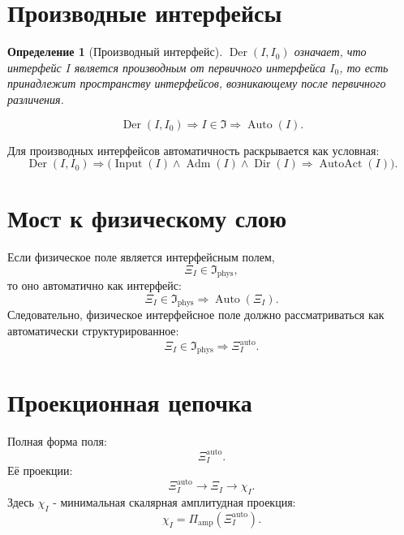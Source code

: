 \documentclass[12pt,a4paper]{article}
\newtheorem{definition}{Определение}
\DeclareMathOperator{\Auto}{Auto}
\DeclareMathOperator{\Input}{Input}
\DeclareMathOperator{\Adm}{Adm}
\DeclareMathOperator{\Dir}{Dir}
\DeclareMathOperator{\AutoAct}{AutoAct}
\DeclareMathOperator{\Der}{Der}
\newcommand{\Ispace}{\mathfrak I}
\newcommand{\XiAuto}{\Xi_I^{\mathrm{auto}}}
\newcommand{\PiAmp}{\Pi_{\mathrm{amp}}}
\begin{document}
\section{Производные интерфейсы}
\begin{definition}[Производный интерфейс]
\(\Der(I,I_0)\) означает, что интерфейс \(I\) является производным от первичного интерфейса \(I_0\), то есть принадлежит пространству интерфейсов, возникающему после первичного различения.
\end{definition}

\begin{equation}
\boxed{\Der(I,I_0)\Rightarrow I\in\Ispace\Rightarrow\Auto(I).}
\end{equation}

Для производных интерфейсов автоматичность раскрывается как условная:
\begin{equation}
\boxed{\Der(I,I_0)\Rightarrow\bigl(\Input(I)\land\Adm(I)\land\Dir(I)\Rightarrow\AutoAct(I)\bigr).}
\end{equation}

\section{Мост к физическому слою}
Если физическое поле является интерфейсным полем,
\begin{equation}
\Xi_I\in\Ispace_{\mathrm{phys}},
\end{equation}
то оно автоматично как интерфейс:
\begin{equation}
\boxed{\Xi_I\in\Ispace_{\mathrm{phys}}\Rightarrow\Auto(\Xi_I).}
\end{equation}
Следовательно, физическое интерфейсное поле должно рассматриваться как автоматически структурированное:
\begin{equation}
\boxed{\Xi_I\in\Ispace_{\mathrm{phys}}\Rightarrow\XiAuto.}
\end{equation}

\section{Проекционная цепочка}
Полная форма поля:
\begin{equation}
\boxed{\XiAuto.}
\end{equation}
Её проекции:
\begin{equation}
\boxed{\XiAuto\to\Xi_I\to\chi_I.}
\end{equation}
Здесь \(\chi_I\) - минимальная скалярная амплитудная проекция:
\begin{equation}
\boxed{\chi_I=\PiAmp(\XiAuto).}
\end{equation}
\end{document}
